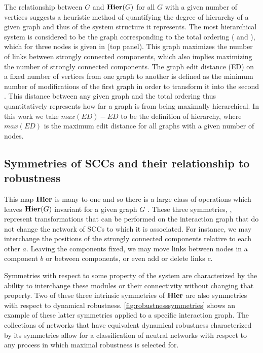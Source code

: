 The relationship between $G$ and $\mathbf{Hier}(G)$ for all $G$ with a given number of vertices suggests a heuristic method of quantifying the degree of hierarchy of a given graph and thus of the system structure it represents. The most hierarchical system is considered to be the graph corresponding to the total ordering ( and \cite{Cormen2009}), which for three nodes is given in  (top panel). This graph maximizes the number of links between strongly connected components, which also implies maximizing the number of strongly connected components. The graph edit distance (ED) on a fixed number of vertices from one graph to another is defined as the minimum number of modifications of the first graph in order to transform it into the second \cite{Axenovich2011}. This distance between any given graph and the total ordering thus quantitatively represents how far a graph is from being maximally hierarchical. In this work we take $max(ED) - ED$ to be the definition of hierarchy, where $max(ED)$ is the maximum edit distance for all graphs with a given number of nodes.

\subsection{Symmetries of SCCs and their relationship to robustness}
This map $\mathbf{Hier}$ is many-to-one and so there is a large class of
operations which leaves $\mathbf{Hier}(G)$ invariant for a given graph $G$ . These three symmetries, , represent transformations that can be performed on the interaction graph that do not change the network of SCCs to which it is associated.
For instance, we may interchange the positions of the strongly
connected components relative to each other $a$.  Leaving the components fixed, we may move links between nodes in a component $b$ or between components, or even add or delete links $c$.

Symmetries with respect to some property of the system are characterized by the ability to interchange these modules or their connectivity without changing that property. Two of these three intrinsic symmetries of $\mathbf{Hier}$ are also symmetries with respect to dynamical robustness. \ref{fig:robustnesssymmetries} shows an example of these latter symmetries applied to a specific interaction graph. The collections of networks that have equivalent dynamical robustness characterized by its symmetries allow for a classification of neutral networks with respect to any process in which maximal robustness is selected for.

